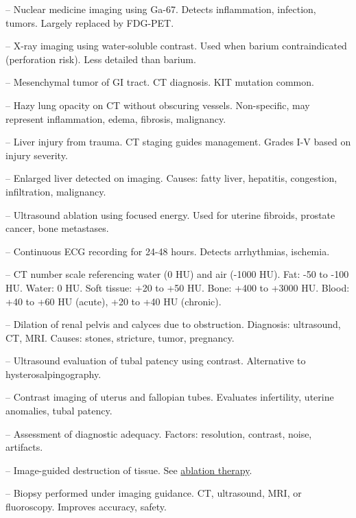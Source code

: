 -- Nuclear medicine imaging using Ga-67. Detects inflammation, infection, tumors. Largely replaced by FDG-PET.

-- X-ray imaging using water-soluble contrast. Used when barium contraindicated (perforation risk). Less detailed than barium.

-- Mesenchymal tumor of GI tract. CT diagnosis. KIT mutation common.


-- Hazy lung opacity on CT without obscuring vessels. Non-specific, may represent inflammation, edema, fibrosis, malignancy.

-- Liver injury from trauma. CT staging guides management. Grades I-V based on injury severity.


-- Enlarged liver detected on imaging. Causes: fatty liver, hepatitis, congestion, infiltration, malignancy.

-- Ultrasound ablation using focused energy. Used for uterine fibroids, prostate cancer, bone metastases.

-- Continuous ECG recording for 24-48 hours. Detects arrhythmias, ischemia.

-- CT number scale referencing water (0 HU) and air (-1000 HU). Fat: -50 to -100 HU. Water: 0 HU. Soft tissue: +20 to +50 HU. Bone: +400 to +3000 HU. Blood: +40 to +60 HU (acute), +20 to +40 HU (chronic).

-- Dilation of renal pelvis and calyces due to obstruction. Diagnosis: ultrasound, CT, MRI. Causes: stones, stricture, tumor, pregnancy.

-- Ultrasound evaluation of tubal patency using contrast. Alternative to hysterosalpingography.

-- Contrast imaging of uterus and fallopian tubes. Evaluates infertility, uterine anomalies, tubal patency.

-- Assessment of diagnostic adequacy. Factors: resolution, contrast, noise, artifacts.

-- Image-guided destruction of tissue. See \hyperlink{Ablation Therapy}{ablation therapy}.

-- Biopsy performed under imaging guidance. CT, ultrasound, MRI, or fluoroscopy. Improves accuracy, safety.

